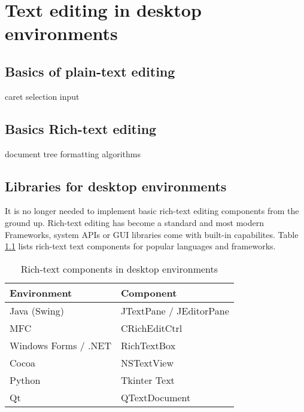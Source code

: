 
\chapter{Text editing in desktop environments}

\section{Basics of plain-text editing} %

caret
selection
input

\section{Basics Rich-text editing} %

document tree
formatting algorithms


\section{Libraries for desktop environments}

It is no longer needed to implement basic rich-text editing components from the ground up. Rich-text editing has become a standard and most modern Frameworks, system APIs or GUI libraries come with built-in capabilites. Table \ref{table:rich-text-components-desktop} lists rich-text text components for popular languages and frameworks.

\begin{table}[]
\centering
\begin{tabular}{ll}
\hline
Environment & Component \\ \hline
Java (Swing) & JTextPane / JEditorPane \\
MFC & CRichEditCtrl \\
Windows Forms / .NET & RichTextBox \\
Cocoa & NSTextView \\
Python & Tkinter Text \\
Qt & QTextDocument \\ \hline
\end{tabular}
\caption{Rich-text components in desktop environments}
\label{table:rich-text-components-desktop}
\end{table}